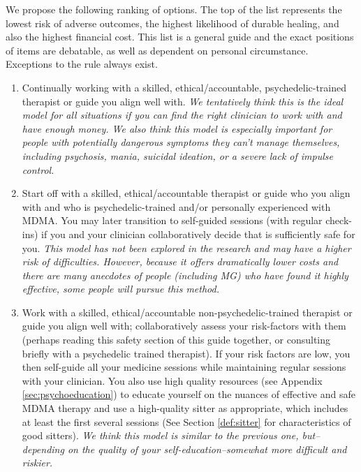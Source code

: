 \documentclass[12pt,letterpaper]{book}
\begin{document}
We propose the following ranking of options. The top of the list represents the lowest risk of adverse outcomes, the highest likelihood of durable healing, and also the highest financial cost. This list is a general guide and the exact positions of items are debatable, as well as dependent on personal circumstance. Exceptions to the rule always exist.
\begin{enumerate}
    \item Continually working with a skilled, ethical/accountable, psychedelic-trained therapist or guide you align well with. \textit{We tentatively think this is the ideal model for all situations if you can find the right clinician to work with and have enough money. We also think this model is especially important for people with potentially dangerous symptoms they can't manage themselves, including psychosis, mania, suicidal ideation, or a severe lack of impulse control.}
    \item Start off with a skilled, ethical/accountable therapist or guide who you align with and who is psychedelic-trained and/or personally experienced with MDMA. You may later transition to self-guided sessions (with regular check-ins) if you and your clinician collaboratively decide that is sufficiently safe for you. \textit{This model has not been explored in the research and may have a higher risk of difficulties. However, because it offers dramatically lower costs and there are many anecdotes of people (including MG) who have found it highly effective, some people will pursue this method.}
    \item Work with a skilled, ethical/accountable non-psychedelic-trained therapist or guide you align well with; collaboratively assess your risk-factors with them (perhaps reading this safety section of this guide together, or consulting briefly with a psychedelic trained therapist). If your risk factors are low, you then self-guide all your medicine sessions while maintaining regular sessions with your clinician. You also use high quality resources (see Appendix \ref{sec:psychoeducation}) to educate yourself on the nuances of effective and safe MDMA therapy and use a high-quality sitter as appropriate, which includes at least the first several sessions (See Section \ref{def:sitter} for characteristics of good sitters). \textit{We think this model is similar to the previous one, but–depending on the quality of your self-education–somewhat more difficult and riskier.}

\end{enumerate}
\end{document}

